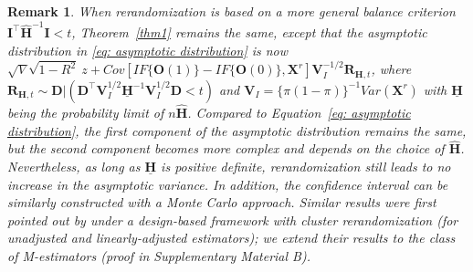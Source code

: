 \documentclass[12pt]{article}
\newtheorem{remark}{Remark}
\newcommand{\bX}{\boldsymbol{X}}\newcommand{\bO}{\boldsymbol{O}}
\newcommand{\bI}{\boldsymbol{I}}
\newcommand{\bD}{\boldsymbol{D}}
\newcommand{\bfV}{\mathbf{V}}
\begin{document}
\begin{remark}\label{remark1}
When rerandomization is based on a more general balance criterion $\bI^\top \widehat{\mathbf{H}}^{-1} \bI < t$, Theorem~\ref{thm1} remains the same, except that the asymptotic distribution in \eqref{eq: asymptotic distribution} is now $\sqrt{V}\sqrt{1-R^2}\ z +  Cov[IF\{\bO(1)\}- IF\{\bO(0)\}, \bX^r]\bfV_I^{-1/2} \boldsymbol{R}_{\mathbf{H},t}$, where $\boldsymbol{R}_{\mathbf{H},t} \sim \bD|(\bD^\top\bfV_I^{1/2} \underline{\mathbf{H}}^{-1}\bfV_I^{1/2} \bD < t)$ and $\bfV_I = \{\pi(1-\pi)\}^{-1} Var(\bX^r)$ with $\underline{\mathbf{H}}$ being the probability limit of $n\widehat{\mathbf{H}}$. 
Compared to Equation~\eqref{eq: asymptotic distribution}, the first component of the asymptotic distribution remains the same, but the second component becomes more complex and depends on the choice of $\widehat{\mathbf{H}}$. Nevertheless, as long as $\underline{\mathbf{H}}$ is positive definite, rerandomization still leads to no increase in the asymptotic variance. In addition, the confidence interval can be similarly constructed with a Monte Carlo approach. Similar results were first pointed out by \cite{lu2023design} under a design-based framework with cluster rerandomization (for unadjusted and linearly-adjusted estimators); we extend their results to the class of M-estimators (proof in Supplementary Material B).
\end{remark}
\end{document}
